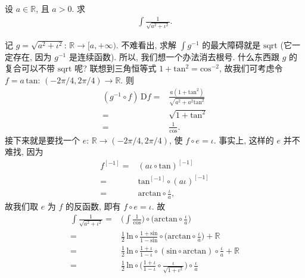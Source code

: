 \begin{example}
    设 $a \in \mathbb{R}$, 且 $a > 0$. 求
    \begin{align*}
        \int {\frac{1}{\sqrt{a^2 + \iota^2}}}.
    \end{align*}

    记 $g = \sqrt{a^2 + \iota^2}$: $\mathbb{R} \to [a, +\infty)$. 不难看出, 求解 $\int {g^{-1}}$ 的最大障碍就是 $\mathrm{sqrt}$ (它一定存在, 因为 $g^{-1}$ 是连续函数). 所以, 我们想一个办法消去根号. 什么东西跟 $g$ 的复合可以不带 $\mathrm{sqrt}$ 呢? 联想到三角恒等式 $1 + \mathrm{tan}^2 = \mathrm{cos}^{-2}$, 故我们可考虑令 $f = a\,\mathrm{tan}$: $(-2\pi/4, 2\pi/4) \to \mathbb{R}$. 则
    \begin{align*}
        (g^{-1} \circ f)\,\mathrm{D}f
        = {} & \frac{a (1 + \mathrm{tan}^2)}{\sqrt{a^2 + a^2 \mathrm{tan}^2}} \\
        = {} & \sqrt{1 + \mathrm{tan}^2}                                      \\
        = {} & \frac{1}{\mathrm{cos}}.
    \end{align*}
    接下来就是要找一个 $e$: $\mathbb{R} \to (-2\pi/4, 2\pi/4)$, 使 $f \circ e = \iota$. 事实上, 这样的 $e$ 并不难找, 因为
    \begin{align*}
        f^{[-1]}
        = {} & (a\iota \circ \mathrm{tan})^{[-1]}        \\
        = {} & \mathrm{tan}^{[-1]} \circ (a\iota)^{[-1]} \\
        = {} & \mathrm{arctan} \circ \frac{\iota}{a},
    \end{align*}
    故我们取 $e$ 为 $f$ 的反函数, 即有 $f \circ e = \iota$. 故
    \begin{align*}
        \int {\frac{1}{\sqrt{a^2 + \iota^2}}}
        = {} & \Bigg( \int {\frac{1}{\mathrm{cos}}} \Bigg) \circ
        \Bigg( \mathrm{arctan} \circ \frac{\iota}{a} \Bigg)                     \\
        = {} & \frac{1}{2}\,\mathrm{ln} \circ
        \frac{1 + \mathrm{sin}}{1 - \mathrm{sin}} \circ
        \Bigg( \mathrm{arctan} \circ \frac{\iota}{a} \Bigg) + \mathbb{R}        \\
        = {} & \frac{1}{2}\,\mathrm{ln} \circ \frac{1 + \iota}{1 - \iota} \circ
        (\mathrm{sin} \circ \mathrm{arctan}) \circ \frac{\iota}{a}
        + \mathbb{R}                                                            \\
        = {} & \frac{1}{2}\,\mathrm{ln} \circ \Bigg(\frac{1 + \iota}{1 - \iota}
        \circ \frac{\iota}{\sqrt{1 + \iota^2}} \Bigg) \circ \frac{\iota}{a}

\end{align*}
\end{example}
